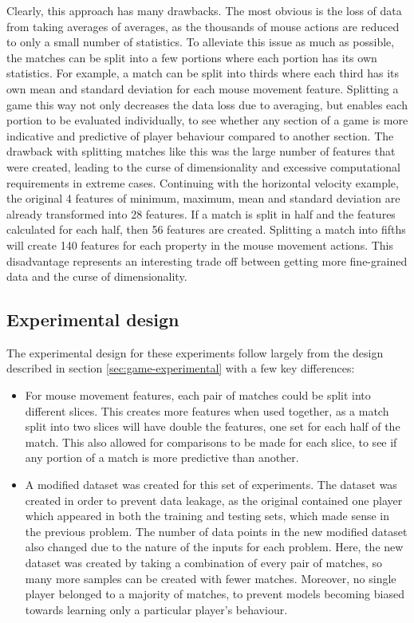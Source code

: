\documentclass[Report.tex]{subfiles}
\begin{document}
Clearly, this approach has many drawbacks. The most obvious is the loss of data from taking averages of averages, as the thousands of mouse actions are reduced to only a small number of statistics. To alleviate this issue as much as possible, the matches can be split into a few portions where each portion has its own statistics. For example, a match can be split into thirds where each third has its own mean and standard deviation for each mouse movement feature. Splitting a game this way not only decreases the data loss due to averaging, but enables each portion to be evaluated individually, to see whether any section of a game is more indicative and predictive of player behaviour compared to another section. The drawback with splitting matches like this was the large number of features that were created, leading to the curse of dimensionality and excessive computational requirements in extreme cases. Continuing with the horizontal velocity example, the original 4 features of minimum, maximum, mean and standard deviation are already transformed into 28 features. If a match is split in half and the features calculated for each half, then 56 features are created. Splitting a match into fifths will create 140 features for each property in the mouse movement actions. This disadvantage represents an interesting trade off between getting more fine-grained data and the curse of dimensionality. 

\subsection{Experimental design}
The experimental design for these experiments follow largely from the design described in section \ref{sec:game-experimental} with a few key differences:
\begin{itemize}
\item For mouse movement features, each pair of matches could be split into different slices. This creates more features when used together, as a match split into two slices will have double the features, one set for each half of the match. This also allowed for comparisons to be made for each slice, to see if any portion of a match is more predictive than another. 
\item A modified dataset was created for this set of experiments. The dataset was created in order to prevent data leakage, as the original contained one player which appeared in both the training and testing sets, which made sense in the previous problem. The number of data points in the new modified dataset also changed due to the nature of the inputs for each problem. Here, the new dataset was created by taking a combination of every pair of matches, so many more samples can be created with fewer matches. Moreover, no single player belonged to a majority of matches, to prevent models becoming biased towards learning only a particular player's behaviour.

\end{itemize}
\end{document}
